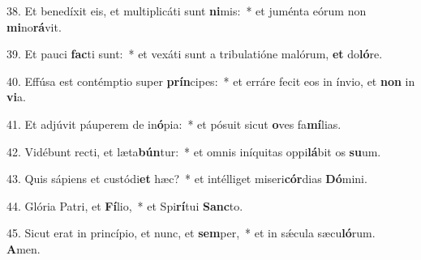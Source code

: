 38. Et benedíxit eis, et multiplicáti sunt \textbf{ni}mis:~*  et juménta eórum non \textbf{mi}no\textbf{rá}vit.\

39. Et pauci \textbf{fac}ti sunt:~*  et vexáti sunt a tribulatióne malórum, \textbf{et} do\textbf{ló}re.\

40. Effúsa est contémptio super \textbf{prín}cipes:~*  et erráre fecit eos in ínvio, et \textbf{non} in \textbf{vi}a.\

41. Et adjúvit páuperem de in\textbf{ó}pia:~*  et pósuit sicut \textbf{o}ves fa\textbf{mí}lias.\

42. Vidébunt recti, et læta\textbf{bún}tur:~*  et omnis iníquitas oppi\textbf{lá}bit os \textbf{su}um.\

43. Quis sápiens et custódi\textbf{et} hæc?~*  et intélliget miseri\textbf{cór}dias \textbf{Dó}mini.\

44. Glória Patri, et \textbf{Fí}lio,~*  et Spi\textbf{rí}tui \textbf{Sanc}to.\

45. Sicut erat in princípio, et nunc, et \textbf{sem}per,~*  et in sǽcula sæcu\textbf{ló}rum. \textbf{A}men.\

